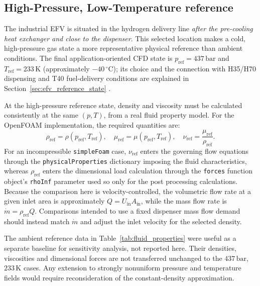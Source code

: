 \subsection{High-Pressure, Low-Temperature reference}
\label{sec:doe_highpressure_state}

The industrial EFV is situated in the hydrogen delivery line \emph{after the pre-cooling heat exchanger and close to the dispenser}. This selected location makes a cold, high-pressure gas state a more representative physical reference than ambient conditions. The final application-oriented CFD state is $p_{\mathrm{ref}}=437\,\mathrm{bar}$ and $T_{\mathrm{ref}}=233\,\mathrm{K}$ (approximately $-40\,^{\circ}\mathrm{C}$); its choice and the connection with H35/H70 dispensing and T40 fuel-delivery conditions are explained in Section~\ref{sec:efv_reference_state} \cite{sae_j2601,elgowainy2017}.

At the high-pressure reference state, density and viscosity must be calculated consistently at the same $(p,T)$, from a real fluid property model. For the OpenFOAM implementation, the required quantities are:
\begin{equation}
\rho_{\mathrm{ref}}=\rho(p_{\mathrm{ref}},T_{\mathrm{ref}}),\quad
\mu_{\mathrm{ref}}=\mu(p_{\mathrm{ref}},T_{\mathrm{ref}}),\quad
\nu_{\mathrm{ref}}=\frac{\mu_{\mathrm{ref}}}{\rho_{\mathrm{ref}}}.
\label{eq:highpressure_properties}
\end{equation}
For an incompressible \texttt{simpleFoam} case, $\nu_{\mathrm{ref}}$ enters the governing flow equations through the \texttt{physicalProperties} dictionary imposing the fluid characteristics, whereas $\rho_{\mathrm{ref}}$ enters the dimensional load calculation through the \texttt{forces} function object's \texttt{rhoInf} parameter used so only for the post processing calculations.\\

Because the comparison here is velocity-controlled, the volumetric flow rate at a given inlet area is approximately $Q=U_{\mathrm{in}}A_{\mathrm{in}}$, while the mass flow rate is $\dot m=\rho_{\mathrm{ref}}Q$. Comparisons intended to use a fixed dispenser mass flow demand should instead match $\dot m$ and adjust the inlet velocity for the selected density.

The ambient reference data in Table~\ref{tab:fluid_properties} were useful as a separate baseline for sensitivity analysis, not reported here. Their densities, viscosities and dimensional forces are not transferred unchanged to the $437\,\mathrm{bar}$, $233\,\mathrm{K}$ cases. Any extension to strongly nonuniform pressure and temperature fields would require reconsideration of the constant-density approximation.

